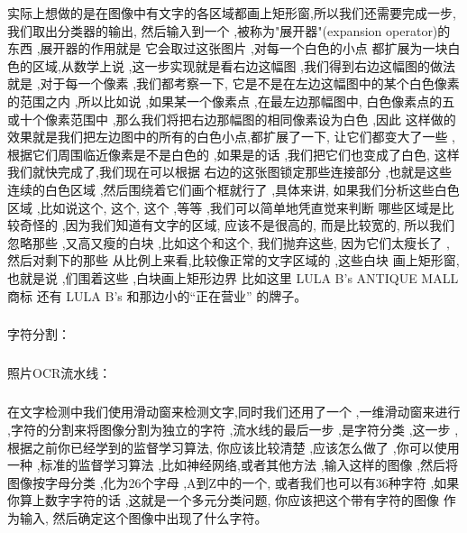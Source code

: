 \documentclass{article}
\begin{document}
\begin{CJK}{UTF8}{gbsn}
实际上想做的是在图像中有文字的各区域都画上矩形窗,所以我们还需要完成一步, 我们取出分类器的输出, 然后输入到一个 ,被称为"展开器"(expansion operator)的东西 ,展开器的作用就是 它会取过这张图片 ,对每一个白色的小点 都扩展为一块白色的区域,从数学上说 ,这一步实现就是看右边这幅图 ,我们得到右边这幅图的做法就是 ,对于每一个像素 ,我们都考察一下, 它是不是在左边这幅图中的某个白色像素的范围之内 ,所以比如说 ,如果某一个像素点 ,在最左边那幅图中, 白色像素点的五或十个像素范围中 ,那么我们将把右边那幅图的相同像素设为白色 ,因此 这样做的效果就是我们把左边图中的所有的白色小点,都扩展了一下, 让它们都变大了一些 ,根据它们周围临近像素是不是白色的 ,如果是的话 ,我们把它们也变成了白色, 这样我们就快完成了,我们现在可以根据 右边的这张图锁定那些连接部分 ,也就是这些连续的白色区域 ,然后围绕着它们画个框就行了 ,具体来讲, 如果我们分析这些白色区域 ,比如说这个, 这个, 这个 ,等等 ,我们可以简单地凭直觉来判断 哪些区域是比较奇怪的 ,因为我们知道有文字的区域, 应该不是很高的, 而是比较宽的, 所以我们忽略那些 ,又高又瘦的白块 ,比如这个和这个, 我们抛弃这些, 因为它们太瘦长了 ,然后对剩下的那些 从比例上来看,比较像正常的文字区域的 ,这些白块 画上矩形窗, 也就是说 ,们围着这些 ,白块画上矩形边界 比如这里 LULA B's ANTIQUE MALL 商标 还有 LULA B's 和那边小的“正在营业” 的牌子。
\begin{figure}[H]
\label{fig:2213}
\end{figure}
\subparagraph{}
字符分割：
\begin{figure}[H]
\label{fig:2220}
\end{figure}
\subparagraph{}
照片OCR流水线：
\begin{figure}[H]
\label{fig:2221}
\end{figure}
\subparagraph{}
在文字检测中我们使用滑动窗来检测文字,同时我们还用了一个 ,一维滑动窗来进行 ,字符的分割来将图像分割为独立的字符 ,流水线的最后一步 ,是字符分类 ,这一步 ,根据之前你已经学到的监督学习算法, 你应该比较清楚 ,应该怎么做了 ,你可以使用一种 ,标准的监督学习算法 ,比如神经网络,或者其他方法 ,输入这样的图像 ,然后将图像按字母分类 ,化为26个字母 ,A到Z中的一个, 或者我们也可以有36种字符 ,如果你算上数字字符的话 ,这就是一个多元分类问题, 你应该把这个带有字符的图像 作为输入, 然后确定这个图像中出现了什么字符。

\end{CJK}
\end{document}
